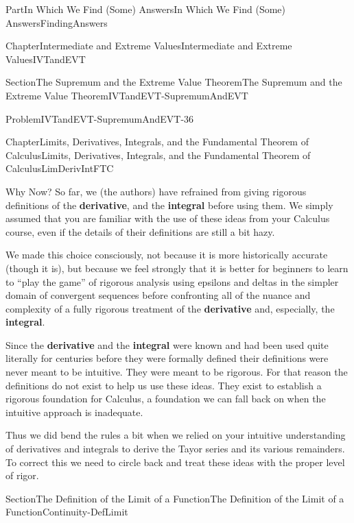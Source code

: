 \documentclass[oneside,10pt,]{book}
\newcommand{\terminology}[1]{\textbf{#1}}
\numberwithin{equation}{part}
\begin{document}
\begin{partptx}{Part}{In Which We Find (Some) Answers}{}{In Which We Find (Some) Answers}{}{}{FindingAnswers}
\begin{chapterptx}{Chapter}{Intermediate and Extreme Values}{}{Intermediate and Extreme Values}{}{}{IVTandEVT}
\begin{sectionptx}{Section}{The Supremum and the Extreme Value Theorem}{}{The Supremum and the Extreme Value Theorem}{}{}{IVTandEVT-SupremumAndEVT}
\begin{problem}{Problem}{}{IVTandEVT-SupremumAndEVT-36}
\end{problem}
\end{sectionptx}
\end{chapterptx}
%
%
\typeout{************************************************}
\typeout{************************************************}
%
\begin{chapterptx}{Chapter}{Limits, Derivatives, Integrals, and the Fundamental Theorem of Calculus}{}{Limits, Derivatives, Integrals, and the Fundamental Theorem of Calculus}{}{}{LimDerivIntFTC}
\renewcommand*{\chaptername}{Chapter}
\begin{introduction}{Why Now?}%
So far, we (the authors) have refrained from giving rigorous definitions of the \terminology{derivative}, and the \terminology{integral} before using them. We simply assumed that you are familiar with the use of these ideas from your Calculus course, even if the details of their definitions are still a bit hazy.%
\par
We made this choice consciously, not because it is more historically accurate (though it is), but because we feel strongly that it is better for beginners to learn to ``play the game'' of rigorous analysis using epsilons and deltas in the simpler domain of convergent sequences before confronting all of the nuance and complexity of a fully rigorous treatment of the \terminology{derivative} and, especially, the \terminology{integral}.%
\par
Since the \terminology{derivative} and the \terminology{integral} were known and had been used quite literally for centuries before they were formally defined their definitions were never meant to be intuitive. They were meant to be rigorous.  For that reason the definitions do not exist to help us use these ideas. They exist to establish a rigorous foundation for Calculus, a foundation we can fall back on when the intuitive approach is inadequate.%
\par
Thus we did bend the rules a bit when we relied on your intuitive understanding of derivatives and integrals to derive the Tayor series and its various remainders. To correct this we need to circle back and treat these ideas with the proper level of rigor.%
\end{introduction}%
%
%
\typeout{************************************************}
\typeout{************************************************}
%
\begin{sectionptx}{Section}{The Definition of the Limit of a Function}{}{The Definition of the Limit of a Function}{}{}{Continuity-DefLimit}

\end{sectionptx}
\end{chapterptx}
\end{partptx}
\end{document}
